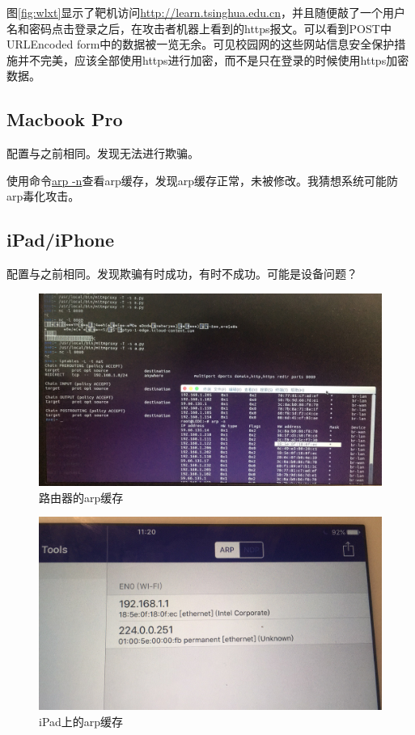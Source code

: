 \documentclass[a4paper]{article}
\begin{document}
图\ref{fig:wlxt}显示了靶机访问\uline{http://learn.tsinghua.edu.cn}，并且随便敲了一个用户名和密码点击登录之后，在攻击者机器上看到的https报文。可以看到POST中URLEncoded form中的数据被一览无余。可见校园网的这些网站信息安全保护措施并不完美，应该全部使用https进行加密，而不是只在登录的时候使用https加密数据。

\subsection{Macbook Pro}
配置与之前相同。发现无法进行欺骗。

使用命令\uline{arp -n}查看arp缓存，发现arp缓存正常，未被修改。我猜想系统可能防arp毒化攻击。
\subsection{iPad/iPhone}
配置与之前相同。发现欺骗有时成功，有时不成功。可能是设备问题？

\begin{figure}[htp]
\centering
\includegraphics[width=0.9\linewidth]{wifi_arp.jpg}
\caption{路由器的arp缓存}
\label{fig:wifi_arp}
\end{figure}

\begin{figure}[htp]
\centering
\includegraphics[width=0.9\linewidth]{ipad_arp.jpg}
\caption{iPad上的arp缓存}
\label{fig:ipad_arp}
\end{figure}
\end{document}
